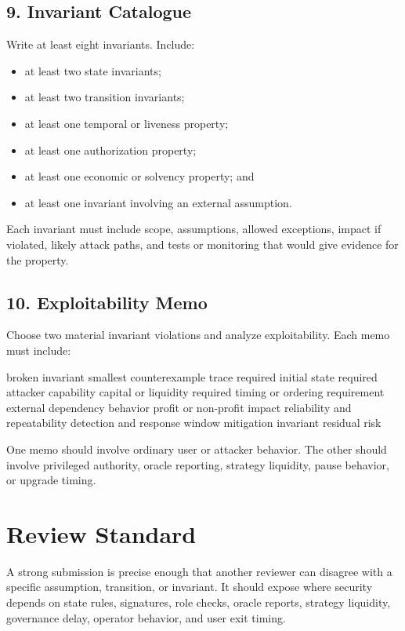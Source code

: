 \subsection*{9. Invariant Catalogue}

Write at least eight invariants. Include:

\begin{itemize}
\item at least two state invariants;
\item at least two transition invariants;
\item at least one temporal or liveness property;
\item at least one authorization property;
\item at least one economic or solvency property; and
\item at least one invariant involving an external assumption.
\end{itemize}

Each invariant must include scope, assumptions, allowed exceptions, impact if violated, likely attack paths, and tests or monitoring that would give evidence for the property.

\subsection*{10. Exploitability Memo}

Choose two material invariant violations and analyze exploitability. Each memo must include:

\begin{codeblock}
broken invariant
smallest counterexample trace
required initial state
required attacker capability
capital or liquidity required
timing or ordering requirement
external dependency behavior
profit or non-profit impact
reliability and repeatability
detection and response window
mitigation invariant
residual risk
\end{codeblock}

One memo should involve ordinary user or attacker behavior. The other should involve privileged authority, oracle reporting, strategy liquidity, pause behavior, or upgrade timing.

\section*{Review Standard}

A strong submission is precise enough that another reviewer can disagree with a specific assumption, transition, or invariant. It should expose where security depends on state rules, signatures, role checks, oracle reports, strategy liquidity, governance delay, operator behavior, and user exit timing.


